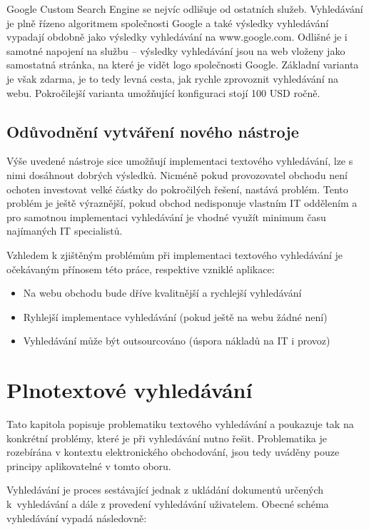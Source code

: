 \documentclass[FM,DP]{tulthesis}
\begin{document}
Google Custom Search Engine \cite{gse} se nejvíc odlišuje od ostatních služeb. 
Vyhledávání je plně řízeno algoritmem společnosti Google a také výsledky vyhledávání
vypadají obdobně jako výsledky vyhledávání na www.google.com. 
Odlišné je i samotné napojení na službu -- výsledky vyhledávání jsou na web
vloženy jako samostatná stránka, na které je vidět logo společnosti Google.
Základní varianta je však zdarma, je to tedy levná cesta, jak rychle zprovoznit
vyhledávání na webu. Pokročilejší varianta umožňující konfiguraci stojí 100 USD ročně.

\section{Odůvodnění vytváření nového nástroje}

Výše uvedené nástroje sice umožňují implementaci textového vyhledávání, lze s nimi
dosáhnout dobrých výsledků. Nicméně pokud provozovatel obchodu není ochoten investovat
velké částky do pokročilých řešení, nastává problém. Tento problém je ještě výraznější, 
pokud obchod nedisponuje vlastním IT oddělením a pro samotnou implementaci vyhledávání
je vhodné využít minimum času najímaných IT specialistů.

Vzhledem k zjištěným problémům při implementaci textového vyhledávání je očekávaným
přínosem této práce, respektive vzniklé aplikace:

\begin{itemize}
\item Na webu obchodu bude dříve kvalitnější a rychlejší vyhledávání
\item Ryhlejší implementace vyhledávání (pokud ještě na webu žádné není)
\item Vyhledávání může být outsourcováno (úspora nákladů na IT i provoz)
\end{itemize}


\chapter{Plnotextové vyhledávání}

Tato kapitola popisuje problematiku textového vyhledávání a poukazuje tak na konkrétní
problémy, které je při vyhledávání nutno řešit. Problematika je rozebírána v kontextu
elektronického obchodování, jsou tedy uváděny pouze principy aplikovatelné v tomto
oboru.

Vyhledávání je proces sestávající jednak z ukládání dokumentů určených k~vyhledávání
a dále z provedení vyhledávání uživatelem. Obecné schéma vyhledávání vypadá následovně:
\end{document}
